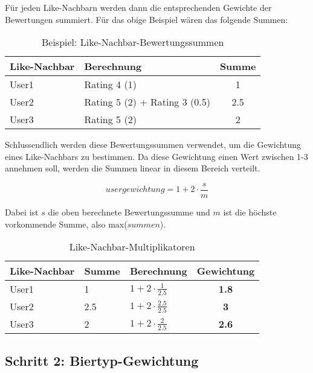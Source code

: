 \documentclass[10pt,a4paper]{scrartcl}
\begin{document}
Für jeden Like-Nachbarn werden dann die entsprechenden Gewichte der Bewertungen summiert. Für
das obige Beispiel wären das folgende Summen:

\begin{table}[h!]
	\begin{center}
		\begin{tabular}{llc}
			\toprule
			Like-Nachbar & Berechnung & Summe \\
			\midrule
			User1 & Rating 4 (1) & 1 \\
			User2 & Rating 5 (2) + Rating 3 (0.5) & 2.5 \\
			User3 & Rating 5 (2) & 2 \\
			\bottomrule
		\end{tabular}
	\end{center}
	\label{like-nachbar-bewertungssummen}
	\caption{Beispiel: Like-Nachbar-Bewertungssummen}
\end{table}

Schlussendlich werden diese Bewertungssummen verwendet, um die Gewichtung eines Like-Nachbars zu bestimmen.
Da diese Gewichtung einen Wert zwischen 1-3 annehmen soll, werden die Summen linear in diesem Bereich verteilt.

$$usergewichtung = 1 + 2 \cdot \frac{s}{m}$$

Dabei ist $s$ die oben berechnete Bewertungssumme und $m$ ist die höchste vorkommende Summe, also max($summen$).

\begin{table}[h!]
	\begin{center}
		\begin{tabular}{lllc}
			\toprule
			Like-Nachbar & Summe & Berechnung & Gewichtung \\
			\midrule
			User1 & 1   & $1 + 2 \cdot \frac{1}{2.5}$   & \textbf{1.8} \\
			User2 & 2.5 & $1 + 2 \cdot \frac{2.5}{2.5}$ & \textbf{3}   \\
			User3 & 2   & $1 + 2 \cdot \frac{2}{2.5}$   & \textbf{2.6} \\
			\bottomrule
		\end{tabular}
	\end{center}
	\label{like-nachbar-multiplikatoren}
	\caption{Like-Nachbar-Multiplikatoren}
\end{table}


\newpage
\subsection{Schritt 2: Biertyp-Gewichtung}
\end{document}
